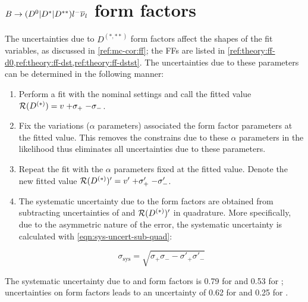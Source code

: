 \section{$B \rightarrow ({{D}^0}|{{D}^*}|D^{**}){l^-}{{\overline{\nu}}_l}$ form factors}
\label{sys-ff}

The uncertainties due to $D^{(*,**)}$ form factors affect the shapes of the fit
variables,
as discussed in \cref{ref:mc-cor:ff};
the FFs are listed in
\cref{ref:theory:ff-d0,ref:theory:ff-dst,ref:theory:ff-dstst}.
The uncertainties due to these parameters can be determined in the following
manner:

\begin{enumerate}
    \item Perform a fit with the nominal settings and call
        the fitted value $\mathcal{R}(D^{(*)}) = v\;{+\sigma_+}\;{-\sigma_-}$.
    \item Fix the variations ($\alpha$ parameters) associated the form factor
        parameters at the fitted value.
        This removes the constrains due to these $\alpha$ parameters in the
        likelihood thus
        eliminates all uncertainties due to these parameters.
    \item Repeat the fit with the $\alpha$ parameters fixed at the fitted
        value.
        Denote the new fitted value
        $\mathcal{R}(D^{(*)})' = v'\;{+\sigma'_+}\;{-\sigma'_-}$.
    \item The systematic uncertainty due to the form factors are
        obtained from subtracting uncertainties of \RDX and $\mathcal{R}(D^{(*)})'$ in
        quadrature.
        More specifically, due to the asymmetric nature of the error,
        the systematic uncertainty is calculated with
        \cref{eqn:sys-uncert-sub-quad}:

        \begin{equation}
            \sigma_\text{sys} = \sqrt{\sigma_+ \sigma_- - \sigma'_+ \sigma'_-}
            \label{eqn:sys-uncert-sub-quad}
        \end{equation}
\end{enumerate}


The systematic uncertainty due to \Dz and \Dstar form factors is 0.79 for
\RD and 0.53 for \RDst;
uncertainties on \Dstst form factors leads to an uncertainty of 0.62 for \RD and
0.25 for \RDst.


